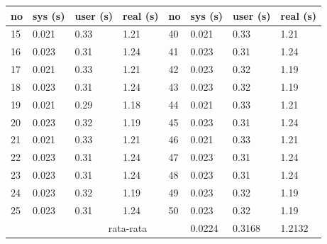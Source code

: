 	
\begin{table}[H]
	\centering
	\begin{tabular}{|l|l|l|l|l|l|l|l|}
		\hline
		no & \multicolumn{1}{c|}{sys (s)} & \multicolumn{1}{c|}{user (s)} & real (s) & \multicolumn{1}{c|}{no} & sys (s) & user (s) & real (s) \\ \hline	
	
		15 & 0.021                        & 0.33                          & 1.21     & 40                      & 0.021   & 0.33     & 1.21     \\ \hline
		16 & 0.023                        & 0.31                          & 1.24     & 41                      & 0.023   & 0.31     & 1.24     \\ \hline
		17 & 0.021                        & 0.33                          & 1.21     & 42                      & 0.023   & 0.32     & 1.19     \\ \hline
		18 & 0.023                        & 0.31                          & 1.24     & 43                      & 0.023   & 0.32     & 1.19     \\ \hline
		19 & 0.021                        & 0.29                          & 1.18     & 44                      & 0.021   & 0.33     & 1.21     \\ \hline
		20 & 0.023                        & 0.32                          & 1.19     & 45                      & 0.023   & 0.31     & 1.24     \\ \hline
		21 & 0.021                        & 0.33                          & 1.21     & 46                      & 0.021   & 0.33     & 1.21     \\ \hline
		22 & 0.023                        & 0.31                          & 1.24     & 47                      & 0.023   & 0.31     & 1.24     \\ \hline
		23 & 0.023                        & 0.31                          & 1.24     & 48                      & 0.023   & 0.31     & 1.24     \\ \hline
		24 & 0.023                        & 0.32                          & 1.19     & 49                      & 0.023   & 0.32     & 1.19     \\ \hline
		25 & 0.023                        & 0.31                          & 1.24     & 50                      & 0.023   & 0.32     & 1.19     \\ \hline
		&                              & \multicolumn{3}{c|}{rata-rata}                                     & 0.0224  & 0.3168   & 1.2132   \\ \hline
	\end{tabular}
\end{table}


